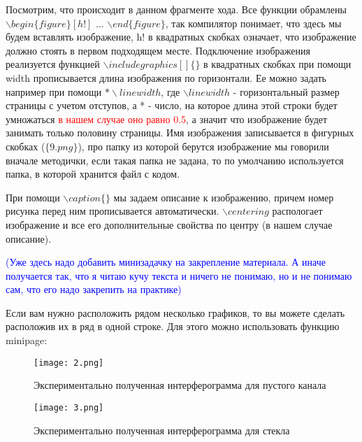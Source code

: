     Посмотрим, что происходит в данном фрагменте хода. Все функции обрамлены $\backslash begin\{figure\}[h!]$ ... $\backslash end\{figure\}$, так компилятор понимает, что здесь мы будем вставлять изображение, h! в квадратных скобках означает, что изображение должно стоять в первом подходящем месте. Подключение изображения реализуется функцией $\backslash includegraphics[]\{\}$ в квадратных скобках при помощи width прописывается длина изображения по горизонтали. Ее можно задать например при помощи $*\backslash linewidth$, где $\backslash linewidth$ - горизонтальный размер страницы с учетом отступов, а * - число, на которое длина этой строки будет умножаться \textcolor{Red}{в нашем случае оно равно 0.5}, а значит что изображение будет занимать только половину страницы. Имя изображения записывается в фигурных скобках ($\{9.png\}$), про папку из которой берутся изображение мы говорили вначале методички, если такая папка не задана, то по умолчанию используется папка, в которой хранится файл с кодом.
    
    При помощи $\backslash caption\{\}$ мы задаем описание к изображению, причем номер рисунка перед ним прописывается автоматически. $\backslash centering$ распологает изображение и все его дополнительные свойства по центру (в нашем случае описание).
    
    \textcolor{Blue}{(Уже здесь надо добавить минизадачку на закрепление материала. А иначе получается так, что я читаю кучу текста и ничего не понимаю, но и не понимаю сам, что его надо закрепить на практике)}

    Если вам нужно расположить рядом несколько графиков, то вы можете сделать расположив их в ряд в одной строке. Для этого можно использовать функцию minipage:
    
    \begin{figure}[h!]
        \begin{center}
            \begin{minipage}[h!]{0.48\linewidth}
                \texttt{[image: 2.png]}
                \caption{Экспериментально полученная интерферограмма для пустого канала}
            \end{minipage}
            \hfill
            \begin{minipage}[h!]{0.48\linewidth}
                \texttt{[image: 3.png]}
                \caption{Экспериментально полученная интерферограмма для стекла}
            \end{minipage}
        \end{center}
    \end{figure}
    

